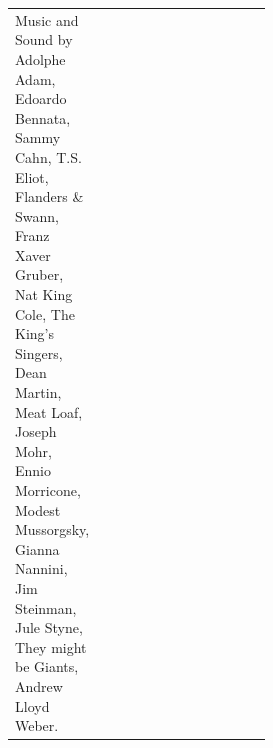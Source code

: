 \documentclass{article}
\begin{document}
\begin{tabular}{>{\centering}p{0.21\linewidth}>{\centering}p{0.30\linewidth}>{\centering}p{}}
\scriptsize\raggedright
Music and Sound by  
Adolphe Adam, %
Edoardo Bennata, %
Sammy Cahn, %
T.S. Eliot, %
Flanders \& Swann, %
Franz Xaver Gruber, %
Nat King Cole, %
The King's Singers, %
Dean Martin, %
Meat Loaf, %
Joseph Mohr, %
Ennio Morricone, %
Modest Mussorgsky, %
Gianna Nannini, %
Jim Steinman, %
Jule Styne, %
They might be Giants, %
Andrew Lloyd Weber. %
 

\end{tabular}
\vfill
\end{document}
